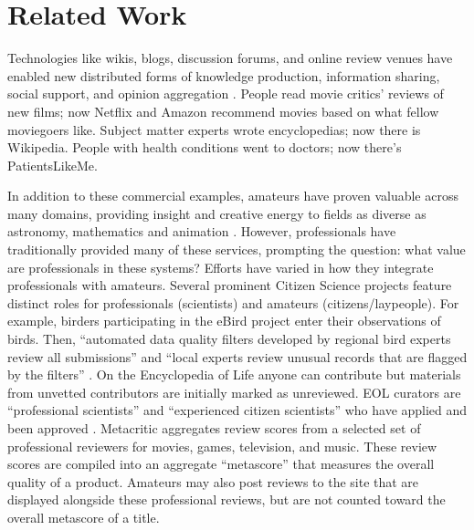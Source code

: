 \documentclass{sig-alternate}
\begin{document}
\section{Related Work}
Technologies like wikis, blogs, discussion forums, and online review
venues have enabled new distributed forms of knowledge production,
information sharing, social support, and opinion aggregation \cite{Benkler2006Wealth}. People read movie critics' reviews of new films; now Netflix and Amazon recommend movies based on what fellow moviegoers like. Subject matter experts wrote encyclopedias; now there is Wikipedia. People with health conditions went to doctors; now there's PatientsLikeMe. 

In addition to these commercial examples, amateurs have proven valuable
across many domains, providing insight and creative energy to fields as diverse as astronomy, mathematics and animation \cite{cooper2010predicting, cranshaw2011polymath, kanefsky2001can, luther2013redistributing}.
However, professionals have traditionally provided many of these services, prompting the question: what value are professionals in these systems?
Efforts have varied in how they integrate professionals with amateurs.
Several prominent Citizen Science projects feature distinct roles for professionals (scientists) and amateurs (citizens/laypeople). For example, birders participating in the eBird project enter their observations of birds. Then, ``automated data quality filters developed by regional bird experts review all submissions'' and ``local experts review unusual records that are flagged by the filters'' \cite{sullivan2009ebird}.
On the Encyclopedia of Life anyone can contribute but materials from
unvetted contributors are initially marked as unreviewed. EOL curators
are ``professional scientists'' and ``experienced citizen scientists'' who have applied and been approved \cite{encyclopediaoflife}. 
Metacritic aggregates review scores from a selected set of professional reviewers for movies, games, television, and music. These review scores are compiled into an aggregate ``metascore'' that measures the overall quality of a product. Amateurs may also post reviews to the site that are displayed alongside these professional reviews, but are not counted toward the overall metascore of a title.
\end{document}
